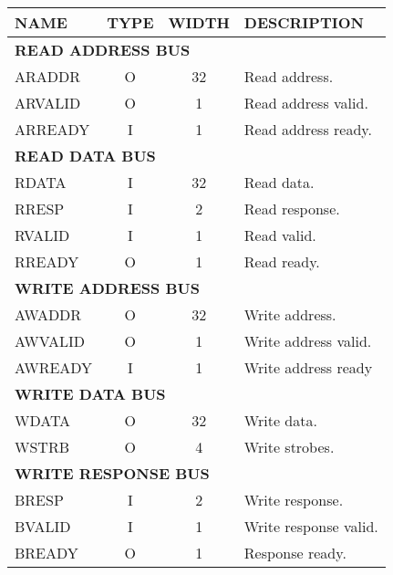 {
\footnotesize
\begin{tabularx}{0.9\textwidth}{|l|c|c|X|}
  \hline
  \cellcolor{gray!20}\textbf{NAME} & \cellcolor{gray!20}\textbf{TYPE} & \cellcolor{gray!20}\textbf{WIDTH} & \cellcolor{gray!20}\textbf{DESCRIPTION} \\
  \hline
  \multicolumn{4}{|l|}{\textbf{READ ADDRESS BUS}} \\
  \hline
  ARADDR & O & 32 & Read address. \\
  \hline
  ARVALID & O & 1 & Read address valid. \\
  \hline
  ARREADY & I & 1 & Read address ready. \\ 
  \hline
  \multicolumn{4}{|l|}{\textbf{READ DATA BUS}} \\
  \hline
  RDATA & I & 32 & Read data. \\
  \hline
  RRESP & I & 2 & Read response. \\
  \hline
  RVALID & I & 1 & Read valid. \\
  \hline
  RREADY & O & 1 & Read ready. \\ 
  \hline
  \multicolumn{4}{|l|}{\textbf{WRITE ADDRESS BUS}} \\
  \hline
  AWADDR & O & 32 & Write address. \\
  \hline
  AWVALID & O & 1 & Write address valid. \\
  \hline
  AWREADY & I & 1 & Write address ready \\
  \hline
  \multicolumn{4}{|l|}{\textbf{WRITE DATA BUS}} \\
  \hline
  WDATA & O & 32 & Write data. \\
  \hline
  WSTRB & O & 4 & Write strobes. \\
  \hline
  \multicolumn{4}{|l|}{\textbf{WRITE RESPONSE BUS}} \\
  \hline
  BRESP & I & 2 & Write response. \\
  \hline
  BVALID & I & 1 & Write response valid. \\
  \hline
  BREADY & O & 1 & Response ready. \\
  \hline
\end{tabularx}
}
